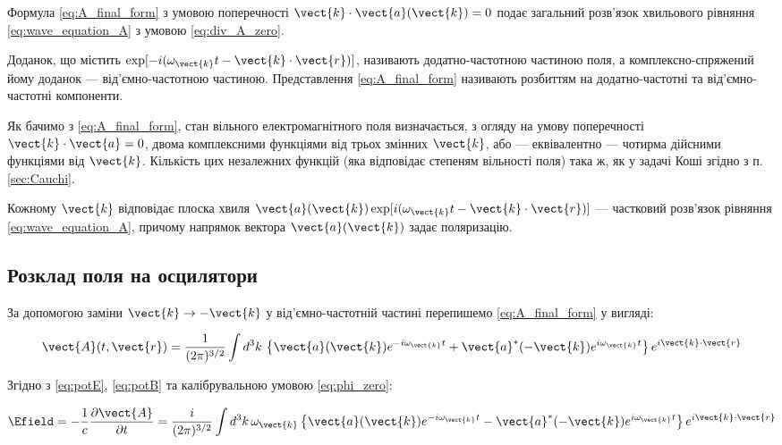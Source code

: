 Формула \eqref{eq:A_final_form} з умовою поперечності \(\vect{k} \cdot \vect{a}(\vect{k}) = 0\) подає загальний розв’язок хвильового рівняння
\eqref{eq:wave_equation_A} з умовою \eqref{eq:div_A_zero}.

Доданок, що містить \(\exp[-i(\omega_{\vect{k}} t - \vect{k} \cdot \vect{r})]\), називають додатно-частотною частиною поля, а комплексно-спряжений йому
доданок --- від’ємно-частотною частиною. Представлення \eqref{eq:A_final_form} називають розбиттям на додатно-частотні та від’ємно-частотні компоненти.

Як бачимо з \eqref{eq:A_final_form}, стан вільного електромагнітного поля визначається, з огляду на умову поперечності \(\vect{k} \cdot \vect{a} = 0\),
двома комплексними функціями від трьох змінних \(\vect{k}\), або --- еквівалентно --- чотирма дійсними функціями від \(\vect{k}\). Кількість цих
незалежних функцій (яка відповідає степеням вільності поля) така ж, як у задачі Коші згідно з п. \ref{sec:Cauchi}.

Кожному \(\vect{k}\) відповідає плоска хвиля \(\vect{a}(\vect{k}) \exp[i(\omega_{\vect{k}} t - \vect{k} \cdot \vect{r})]\) --- частковий розв’язок
рівняння \eqref{eq:wave_equation_A}, причому напрямок вектора \(\vect{a}(\vect{k})\) задає поляризацію.


\subsection*{Розклад поля на осцилятори}

За допомогою заміни \(\vect{k} \rightarrow -\vect{k}\) у від’ємно-частотній частині перепишемо \eqref{eq:A_final_form} у вигляді:

\begin{equation}
\vect{A}(t, \vect{r}) = \frac{1}{(2\pi)^{3/2}} \int d^3k \, \left\{ \vect{a}(\vect{k}) e^{-i\omega_{\vect{k}} t} + \vect{a}^*(-\vect{k})
e^{i\omega_{\vect{k}} t} \right\} e^{i\vect{k} \cdot \vect{r}}
\label{eq:A_final_form_modified}
\end{equation}

Згідно з \eqref{eq:potE}, \eqref{eq:potB} та калібрувальною умовою \eqref{eq:phi_zero}:

\begin{equation}
\Efield = -\frac{1}{c} \frac{\partial \vect{A}}{\partial t} = \frac{i}{(2\pi)^{3/2}} \int d^3k \, \omega_{\vect{k}} \left\{ \vect{a}(\vect{k})
e^{-i\omega_{\vect{k}} t} - \vect{a}^*(-\vect{k}) e^{i\omega_{\vect{k}} t} \right\} e^{i\vect{k} \cdot \vect{r}}
\label{eq:E_field_fourier}
\end{equation}

